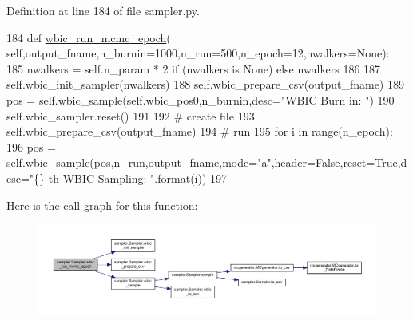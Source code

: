 Definition at line 184 of file sampler.\+py.


\begin{DoxyCode}
184     \textcolor{keyword}{def }\hyperlink{classsampler_1_1Sampler_a5e76a78ad9e222e49f77a4d2e6c23c04}{wbic\_run\_mcmc\_epoch}(
      self,output\_fname,n\_burnin=1000,n\_run=500,n\_epoch=12,nwalkers=None):
185         nwalkers = self.n\_param * 2 \textcolor{keywordflow}{if} (nwalkers \textcolor{keywordflow}{is} \textcolor{keywordtype}{None}) \textcolor{keywordflow}{else} nwalkers 
186         
187         self.wbic\_init\_sampler(nwalkers)
188         self.wbic\_prepare\_csv(output\_fname)
189         pos = self.wbic\_sample(self.wbic\_pos0,n\_burnin,desc=\textcolor{stringliteral}{"WBIC Burn in: "})
190         self.wbic\_sampler.reset()
191 
192         \textcolor{comment}{# create file}
193         self.wbic\_prepare\_csv(output\_fname)
194         \textcolor{comment}{# run}
195         \textcolor{keywordflow}{for} i \textcolor{keywordflow}{in} range(n\_epoch):
196             pos = self.wbic\_sample(pos,n\_run,output\_fname,mode=\textcolor{stringliteral}{"a"},header=\textcolor{keyword}{False},reset=\textcolor{keyword}{True},desc=\textcolor{stringliteral}{"\{\} th WBIC
       Sampling: "}.format(i))
197 \end{DoxyCode}
Here is the call graph for this function\+:\nopagebreak
\begin{figure}[H]
\begin{center}
\leavevmode
\includegraphics[width=350pt]{d3/d8a/classsampler_1_1Sampler_a5e76a78ad9e222e49f77a4d2e6c23c04_cgraph}
\end{center}
\end{figure}
\mbox{\label{classsampler_1_1Sampler_ad07e2a415fe1c3890c6f6efcfe7515db}} 
